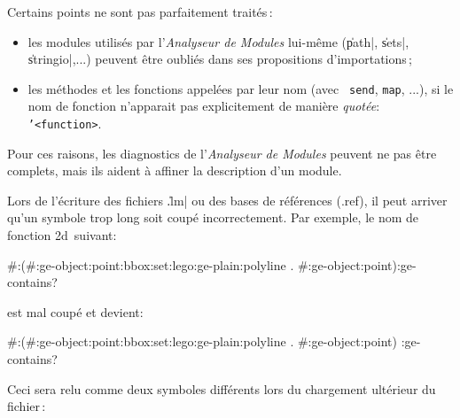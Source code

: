 

Certains points ne sont pas parfaitement trait\'{e}s\,:

\begin{itemize}
\item les modules utilis\'{e}s par l'{\em Analyseur de Modules} lui-m\^{e}me
(\|path|, \|sets|, \|stringio|,...) peuvent \^{e}tre oubli\'{e}s dans ses
propositions d'importations\,;

\item les m\'{e}thodes et les fonctions appel\'{e}es par leur nom (avec {\tt
send}, {\tt map}, ...), si le nom de fonction n'apparait pas
explicitement de mani\`{e}re {\em quot\'{e}e}: {\tt '<function>}.
\end{itemize}

Pour ces raisons, les diagnostics de l'{\em Analyseur de Modules} peuvent ne
pas \^{e}tre complets,
mais ils aident \`{a} affiner la description d'un module.



Lors de l'\'{e}criture des fichiers \|.lm|
ou des bases de r\'{e}f\'{e}rences (.ref),
il peut arriver qu'un symbole trop long soit coup\'{e} incorrectement.
Par exemple, le nom de fonction \Masai2d\ suivant:

\begin{Longcode*}
#:(#:ge-object:point:bbox:set:lego:ge-plain:polyline . #:ge-object:point):ge-contains?
\end{Longcode*}

est mal coup\'{e} et devient:

\begin{Longcode*}
#:(#:ge-object:point:bbox:set:lego:ge-plain:polyline . #:ge-object:point)
:ge-contains?
\end{Longcode*}

Ceci sera relu comme deux symboles diff\'{e}rents lors du chargement
ult\'{e}rieur du fichier\,:

